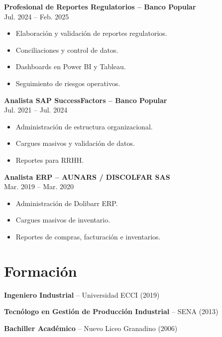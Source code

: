\documentclass[11pt]{article}
\begin{document}
\textbf{Profesional de Reportes Regulatorios -- Banco Popular}\\
Jul. 2024 -- Feb. 2025
\begin{itemize}[leftmargin=*]
\item Elaboración y validación de reportes regulatorios.
\item Conciliaciones y control de datos.
\item Dashboards en Power BI y Tableau.
\item Seguimiento de riesgos operativos.
\end{itemize}

\textbf{Analista SAP SuccessFactors -- Banco Popular}\\
Jul. 2021 -- Jul. 2024
\begin{itemize}[leftmargin=*]
\item Administración de estructura organizacional.
\item Cargues masivos y validación de datos.
\item Reportes para RRHH.
\end{itemize}

\textbf{Analista ERP -- AUNARS / DISCOLFAR SAS}\\
Mar. 2019 -- Mar. 2020
\begin{itemize}[leftmargin=*]
\item Administración de Dolibarr ERP.
\item Cargues masivos de inventario.
\item Reportes de compras, facturación e inventarios.
\end{itemize}

\section*{Formación}
\textbf{Ingeniero Industrial} -- Universidad ECCI (2019)

\textbf{Tecnólogo en Gestión de Producción Industrial} -- SENA (2013)

\textbf{Bachiller Académico} -- Nuevo Liceo Granadino (2006)
\end{document}
